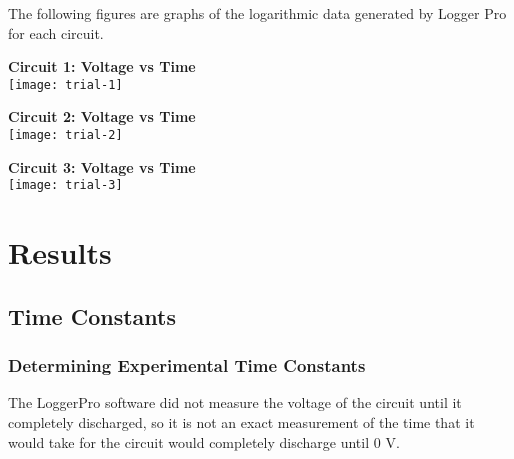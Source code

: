\documentclass[12pt]{article}
\begin{document}
The following figures are graphs of the logarithmic data generated by Logger Pro for each circuit. 

\begin{center} \footnotesize \textbf{Circuit 1: Voltage vs Time} \\ \texttt{[image: trial-1]} \\   \end{center} 


\begin{center} \footnotesize \textbf{Circuit 2: Voltage vs Time} \\ \texttt{[image: trial-2]} \\ \end{center}

\begin{center} \footnotesize \textbf{Circuit 3: Voltage vs Time} \\ \texttt{[image: trial-3]} \\  \end{center}

\pagebreak

\section*{\centering Results}

\subsection*{Time Constants}
\subsubsection*{Determining Experimental Time Constants}


The LoggerPro software did not measure the voltage of the circuit until it completely discharged, so it is not an exact measurement of the time that it would take for the circuit would completely discharge until 0 V. 
\end{document}
